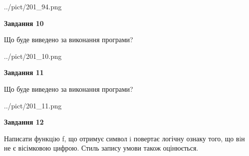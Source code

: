 \documentclass[12pt, ukrainian]{article}
\begin{document}
{\begin {large}
\begin{center}
	{../pict/201_94.png}
\end{center}
\newpage

{\begin {center}\textbf{Завдання 10}\end {center}}

Що буде виведено за виконання програми?\par
\begin{center}
	{../pict/201_10.png}
\end{center}
\newpage

{\begin {center}\textbf{Завдання 11}\end {center}}

Що буде виведено за виконання програми?\par
\begin{center}
	{../pict/201_11.png}
\end{center}
\newpage

{\begin {center}\textbf{Завдання 12}\end {center}}


Написати функцiю f, що отримує символ i повертає логічну ознаку того, що вiн не є вісімковою цифрою. Стиль запису умови також оцінюється.\par
\newpage

\end {large}}
\end{document}
